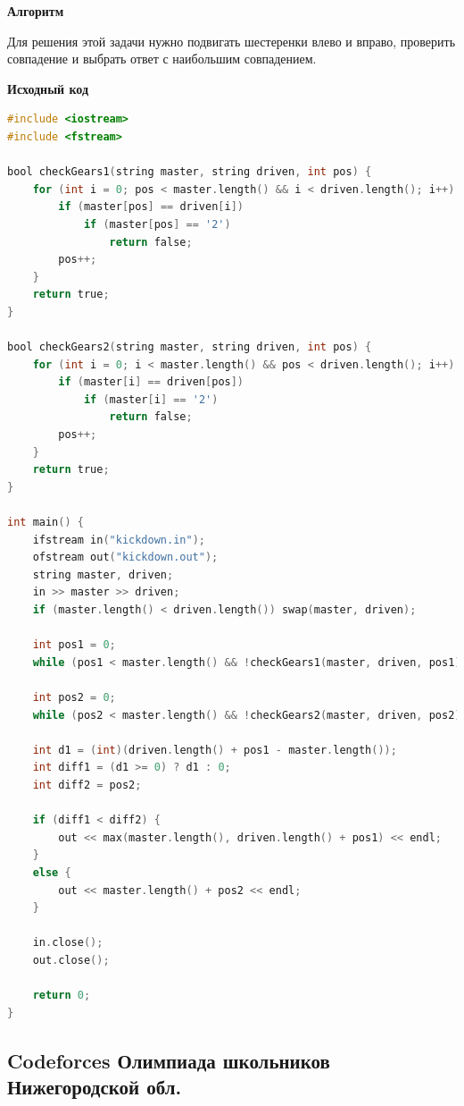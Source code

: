 \documentclass[a4paper,12pt]{article}
\begin{document}
\textbf{{\large Алгоритм}}

Для решения этой задачи нужно подвигать шестеренки влево и вправо, проверить совпадение и выбрать ответ с наибольшим совпадением.

\newpage
\textbf{{\large Исходный код}} \\
\begin{lstlisting}[language=C]
#include <iostream>
#include <fstream>

bool checkGears1(string master, string driven, int pos) {
    for (int i = 0; pos < master.length() && i < driven.length(); i++) {
        if (master[pos] == driven[i])
            if (master[pos] == '2')
                return false;
        pos++;
    }
    return true;
}

bool checkGears2(string master, string driven, int pos) {
    for (int i = 0; i < master.length() && pos < driven.length(); i++) {
        if (master[i] == driven[pos])
            if (master[i] == '2')
                return false;
        pos++;
    }
    return true;
}

int main() {
	ifstream in("kickdown.in");
    ofstream out("kickdown.out");
    string master, driven;
    in >> master >> driven;
    if (master.length() < driven.length()) swap(master, driven);

    int pos1 = 0;
    while (pos1 < master.length() && !checkGears1(master, driven, pos1)) pos1++;

    int pos2 = 0;
    while (pos2 < master.length() && !checkGears2(master, driven, pos2)) pos2++;

    int d1 = (int)(driven.length() + pos1 - master.length());
    int diff1 = (d1 >= 0) ? d1 : 0;
    int diff2 = pos2;

    if (diff1 < diff2) {
        out << max(master.length(), driven.length() + pos1) << endl;
    }
    else {
        out << master.length() + pos2 << endl;
    }

    in.close();
    out.close();

    return 0;
}
\end{lstlisting}



%
%
\newpage
\subsection{Codeforces Олимпиада школьников Нижегородской обл.}
\end{document}
